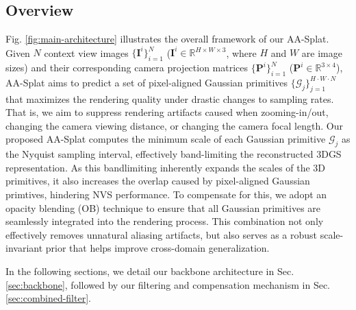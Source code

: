 \documentclass[runningheads]{llncs}
\begin{document}
\subsection{Overview}
Fig. \ref{fig:main-architecture} illustrates the overall framework of our AA-Splat. Given $N$ context view images $\{\mathbf{I}^i\}_{i=1}^N$ ($\mathbf{I}^i\in\mathbb{R}^{H\times W\times 3}$, where $H$ and $W$ are image sizes) and their corresponding camera projection matrices $\{\mathbf{P}^i\}_{i=1}^N$ ($\mathbf{P}^i\in\mathbb{R}^{3\times4}$), AA-Splat aims to predict a set of pixel-aligned Gaussian primitives $\{\mathcal{G}_j\}_{j=1}^{H\cdot W\cdot N}$ that maximizes the rendering quality under drastic changes to sampling rates. That is, we aim to suppress rendering artifacts caused when zooming-in/out, changing the camera viewing distance, or changing the camera focal length. Our proposed AA-Splat computes the minimum scale of each Gaussian primitive $\mathcal{G}_j$ as the Nyquist sampling interval, effectively band-limiting the reconstructed 3DGS representation. As this bandlimiting inherently expands the scales of the 3D primitives, it also increases the overlap caused by pixel-aligned Gaussian primtives, hindering NVS performance. To compensate for this, we adopt an opacity blending (OB) technique to ensure that all Gaussian primitives are seamlessly integrated into the rendering process. This combination not only effectively removes unnatural aliasing artifacts, but also serves as a robust scale-invariant prior that helps improve cross-domain generalization.

In the following sections, we detail our backbone architecture in Sec. \ref{sec:backbone}, followed by our filtering and compensation mechanism in Sec. \ref{sec:combined-filter}.
\end{document}
